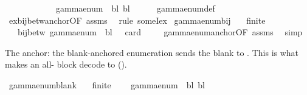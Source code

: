 \begin{isabellebody}
\ \ \ \ \ \ \ \ \ \ \ {\isasymand}\ gamma{\isacharunderscore}{\kern0pt}enum\ {\isasymGamma}\ bl\ bl\ {\isacharequal}{\kern0pt}\ {}{\isachardoublequoteclose}\isanewline
%
\isadelimproof
\ \ %
\endisadelimproof
%
\isatagproof
{}\isamarkupfalse%
\ gamma{\isacharunderscore}{\kern0pt}enum{\isacharunderscore}{\kern0pt}def\isanewline
\ \ \isamarkupfalse%
\ ex{\isacharunderscore}{\kern0pt}bij{\isacharunderscore}{\kern0pt}betw{\isacharunderscore}{\kern0pt}anchor{\isacharbrackleft}{\kern0pt}OF\ assms{\isacharbrackright}{\kern0pt}\ \isamarkupfalse%
\ {\isacharparenleft}{\kern0pt}rule\ someI{\isacharunderscore}{\kern0pt}ex{\isacharparenright}{\kern0pt}%
\endisatagproof
{\isafoldproof}%
%
\isadelimproof
\isanewline
%
\endisadelimproof
\isanewline
{}\isamarkupfalse%
\ gamma{\isacharunderscore}{\kern0pt}enum{\isacharunderscore}{\kern0pt}bij{\isacharcolon}{\kern0pt}\isanewline
\ \ \ {\isachardoublequoteopen}finite\ {\isasymGamma}{\isachardoublequoteclose}\isanewline
\ \ \ {\isachardoublequoteopen}bij{\isacharunderscore}{\kern0pt}betw\ {\isacharparenleft}{\kern0pt}gamma{\isacharunderscore}{\kern0pt}enum\ {\isasymGamma}\ bl{\isacharparenright}{\kern0pt}\ {\isasymGamma}\ {\isacharbraceleft}{\kern0pt}{\isachardot}{\kern0pt}{\isachardot}{\kern0pt}{\isacharless}{\kern0pt}\ card\ {\isasymGamma}{\isacharbraceright}{\kern0pt}{\isachardoublequoteclose}\isanewline
%
\isadelimproof
\ \ %
\endisadelimproof
%
\isatagproof
{}\isamarkupfalse%
\ gamma{\isacharunderscore}{\kern0pt}enum{\isacharunderscore}{\kern0pt}anchor{\isacharbrackleft}{\kern0pt}OF\ assms{\isacharbrackright}{\kern0pt}\ \isamarkupfalse%
\ simp%
\endisatagproof
{\isafoldproof}%
%
\isadelimproof
%
\endisadelimproof
%
\begin{isamarkuptext}%
The anchor: the blank-anchored enumeration sends the blank to
  .  This is what makes an all- block decode to
   ().%
\end{isamarkuptext}\isamarkuptrue%
\isamarkupfalse%
\ gamma{\isacharunderscore}{\kern0pt}enum{\isacharunderscore}{\kern0pt}blank{\isacharcolon}{\kern0pt}\isanewline
\ \ \ {\isachardoublequoteopen}finite\ {\isasymGamma}{\isachardoublequoteclose}\isanewline
\ \ \ {\isachardoublequoteopen}gamma{\isacharunderscore}{\kern0pt}enum\ {\isasymGamma}\ bl\ bl\ {\isacharequal}{\kern0pt}\ {}{\isachardoublequoteclose}\isanewline

\end{isabellebody}
